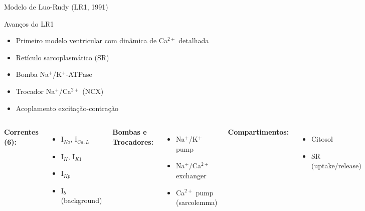 \begin{frame}{Modelo de Luo-Rudy (LR1, 1991)}
\begin{block}{Avanços do LR1}
\begin{itemize}
    \item Primeiro modelo ventricular com dinâmica de Ca$^{2+}$ detalhada
    \item Retículo sarcoplasmático (SR)
    \item Bomba Na$^+$/K$^+$-ATPase
    \item Trocador Na$^+$/Ca$^{2+}$ (NCX)
    \item Acoplamento excitação-contração
\end{itemize}
\end{block}

\vspace{0.3cm}

\begin{columns}
\textbf{Correntes (6):}
\begin{itemize}
    \item I$_{Na}$, I$_{Ca,L}$
    \item I$_{K}$, I$_{K1}$
    \item I$_{Kp}$
    \item I$_{b}$ (background)
\end{itemize}

\textbf{Bombas e Trocadores:}
\begin{itemize}
    \item Na$^+$/K$^+$ pump
    \item Na$^+$/Ca$^{2+}$ exchanger
    \item Ca$^{2+}$ pump (sarcolemma)
\end{itemize}

\textbf{Compartimentos:}
\begin{itemize}
    \item Citosol
    \item SR (uptake/release)
\end{itemize}

\vspace{0.3cm}

\begin{center}
\end{center}
\end{columns}
\end{frame}

